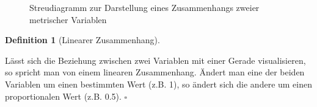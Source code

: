 \documentclass[
  letterpaper,
]{scrbook}
\theoremstyle{definition}
\theoremstyle{definition}
\newtheorem{definition}{Definition}[chapter]
\theoremstyle{definition}
\theoremstyle{remark}
\begin{document}
\begin{figure}

\begin{minipage}{0.50\linewidth}



\end{minipage}%
%
\begin{minipage}{0.50\linewidth}



\end{minipage}%

\caption{\label{fig-streu1}Streudiagramm zur Darstellung eines
Zusammenhangs zweier metrischer Variablen}

\end{figure}%

\begin{definition}[Linearer
Zusammenhang]\protect\hypertarget{def-lin-zshg}{}\label{def-lin-zshg}

Lässt sich die Beziehung zwischen zwei Variablen mit einer Gerade
visualisieren, so spricht man von einem linearen Zusammenhang. Ändert
man eine der beiden Variablen um einen bestimmten Wert (z.B. 1), so
ändert sich die andere um einen proportionalen Wert (z.B. 0.5).
\(\square\)

\end{definition}
\end{document}
